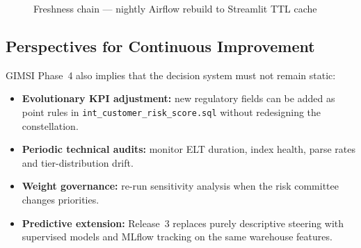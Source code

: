 \begin{figure}[H]
\centering
{}
\caption{Freshness chain --- nightly Airflow rebuild to Streamlit TTL cache}
\label{fig:freshness_chain}
\end{figure}

\subsection{Perspectives for Continuous Improvement}
GIMSI Phase~4 also implies that the decision system must not remain static:
\begin{itemize}
    \item \textbf{Evolutionary KPI adjustment:} new regulatory fields can be added as
          point rules in \texttt{int\_customer\_risk\_score.sql} without redesigning
          the constellation.
    \item \textbf{Periodic technical audits:} monitor ELT duration, index health,
          parse rates and tier-distribution drift.
    \item \textbf{Weight governance:} re-run sensitivity analysis when the risk
          committee changes priorities.
    \item \textbf{Predictive extension:} Release~3 replaces purely descriptive
          steering with supervised models and MLflow tracking on the same warehouse
          features.
\end{itemize}

